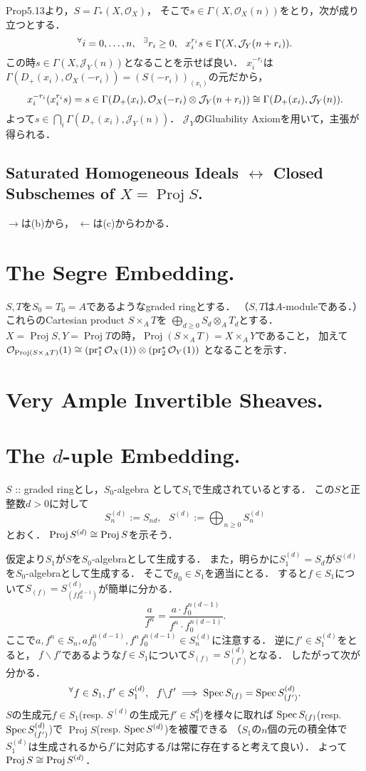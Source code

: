 \documentclass[a4paper]{jsarticle}
\newcommand{\shJ}{\mathcal{J}}
\newcommand{\shO}{\mathcal{O}}
\newcommand{\Proj}{\operatorname{Proj}}
\begin{document}
    Prop5.13より，$S=\Gamma_*(X,\shO_X)$，
    そこで$s \in \Gamma(X,\shO_X(n))$をとり，次が成り立つとする．
    \[ \Forall{i=0,\dots,n} \Exists{r_i \geq 0} x_i^{r_i}s \in \Gamma(X,\shJ_Y(n+r_i)). \]
    この時$s \in \Gamma(X,\shJ_Y(n))$となることを示せば良い．
    $x_i^{-r_i}$は$\Gamma(D_+(x_i),\shO_X(-r_i))=(S(-r_i))_{(x_i)}$の元だから，
    \[  x_i^{-r_i}(x_i^{r_i}s)=s \in \Gamma(D_+(x_i),\shO_X(-r_i) \otimes \shJ_Y(n+r_i)) \iso \Gamma(D_+(x_i),\shJ_Y(n)). \]
    よって$s \in \bigcap_i \Gamma(D_+(x_i),\shJ_Y(n))$．
    $\shJ_Y$のGluability Axiomを用いて，主張が得られる．

    \subsection{Saturated Homogeneous Ideals $\leftrightarrow$ Closed Subschemes of $X=\Proj S$.}
    $\rightarrow$は(b)から，
    $\leftarrow$は(c)からわかる．

\section{The Segre Embedding.} %
    $S,T$を$S_0=T_0=A$であるようなgraded ringとする．
    （$S,T$は$A$-moduleである．）
    これらのCartesian product $S \times_A T$を
    $\bigoplus_{d \geq 0} S_d \otimes_A T_d$とする．
    $X=\Proj S, Y=\Proj T$の時，$\Proj (S \times_A T)=X \times_A Y$であること，
    加えて$\shO_{\Proj (S \times_A T)}(1) \iso (\pr_1^*\shO_{X}(1)) \otimes (\pr_2^*\shO_Y(1))$
    となることを示す．

\section{Very Ample Invertible Sheaves.} %

\section{The $d$-uple Embedding.} %
    $S$ :: graded ringとし，$S_0$-algebra として$S_1$で生成されているとする．
    この$S$と正整数$d>0$に対して
    \[ S_n^{(d)}:=S_{nd},~~~ S^{(d)}:=\bigoplus_{n \geq 0} S_n^{(d)} \]
    とおく．
    $\Proj S^{(d)} \iso \Proj S$を示そう．

    仮定より$S_{1}$が$S$を$S_0$-algebraとして生成する．
    また，明らかに$S_{1}^{(d)}=S_d$が$S^{(d)}$を$S_0$-algebraとして生成する．
    そこで$g_0 \in S_1$を適当にとる．
    すると$f \in S_1$について$S_{(f)}=S_{(f f_0^{d-1})}^{(d)}$が簡単に分かる．
    \[ \frac{a}{f^n}=\frac{a \cdot f_0^{n(d-1)}}{f^n \cdot f_0^{n(d-1)}}. \]
    ここで$a, f^n \in S_n, a f_0^{n(d-1)}, f^n f_0^{n(d-1)} \in S_n^{(d)}$に注意する．
    逆に$f' \in S_1^{(d)}$をとると，
    $f \backslash f'$であるような$f \in S_1$について$S_{(f)}=S_{(f')}^{(d)}$となる．
    したがって次が分かる．
    \[ {}^{\forall} f \in S_1, f' \in S_1^{(d)},~~ f \backslash f' \implies \operatorname{Spec} S_{(f)}=\operatorname{Spec} S_{(f')}^{(d)}. \]
    $S$の生成元$f \in S_1$(resp. $S^{(d)}$の生成元$f' \in S_1^{d}$)を様々に取れば
    $\operatorname{Spec} S_{(f)}$(resp. $\operatorname{Spec} S_{(f')}^{(d)}$)で
    $\Proj S$(resp. $\operatorname{Spec} S^{(d)}$)を被覆できる
    （$S_1$の$n$個の元の積全体で$S_1^{(d)}$は生成されるから$f'$に対応する$f$は常に存在すると考えて良い）．
    よって$\Proj S \iso \Proj S^{(d)}$．
\end{document}
